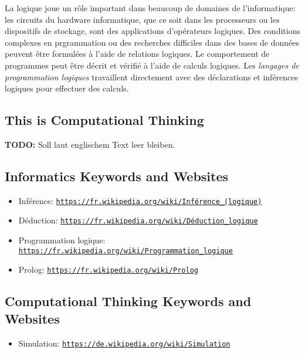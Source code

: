 \documentclass[a4paper,11pt]{report}
\newcommand{\BrochureUrlText}[1]{\texttt{#1}}
\begin{document}
La logique joue un rôle important dans beaucoup de domaines de l’informatique: les circuits du hardware informatique, que ce soit dans les processeurs ou les dispositifs de stockage, sont des applications d’opérateurs logiques. Des conditions complexes en prgrammation ou des recherches difficiles dans des bases de données peuvent être formulées à l’aide de relations logiques. Le comportement de programmes peut être décrit et vérifié à l’aide de calculs logiques. Les \emph{langages de programmation logiques} travaillent directement avec des déclarations et inférences logiques pour effectuer des calculs.


\subsection*{This is Computational Thinking}

\textbf{TODO:} Soll laut englischem Text leer bleiben.


\subsection*{Informatics Keywords and Websites}

\begin{itemize}
  \item Inférence: \href{https://fr.wikipedia.org/wiki/Inf\%C3\%A9rence_(logique)}{\BrochureUrlText{https://fr.wikipedia.org/wiki/Inférence\_(logique)}}
  \item Déduction: \href{https://fr.wikipedia.org/wiki/D\%C3\%A9duction_logique}{\BrochureUrlText{https://fr.wikipedia.org/wiki/Déduction\_logique}}
  \item Programmation logique: \href{https://fr.wikipedia.org/wiki/Programmation_logique}{\BrochureUrlText{https://fr.wikipedia.org/wiki/Programmation\_logique}}
  \item Prolog: \href{https://fr.wikipedia.org/wiki/Prolog}{\BrochureUrlText{https://fr.wikipedia.org/wiki/Prolog}}
\end{itemize}


\subsection*{Computational Thinking Keywords and Websites}

\begin{itemize}
  \item Simulation: \href{https://de.wikipedia.org/wiki/Simulation}{\BrochureUrlText{https://de.wikipedia.org/wiki/Simulation}}
\end{itemize}
\end{document}
